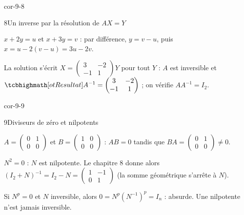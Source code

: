 \begin{blocLivre}{cor-9-8}
\begin{corrige}{8}{Un inverse par la résolution de $AX=Y$}
\begin{questions}
  \item $x+2y=u$ et $x+3y=v$ : par différence, $y=v-u$, puis
    $x=u-2(v-u)=3u-2v$.
  \item La solution s'écrit
    $X=\begin{pmatrix}3&-2\\-1&1\end{pmatrix}Y$ pour tout $Y$ : $A$ est
    inversible et
    $\res{A^{-1}=\begin{pmatrix}3&-2\\-1&1\end{pmatrix}}$ ;
    on vérifie $AA^{-1}=I_2$.
\end{questions}
\end{corrige}
\end{blocLivre}

\begin{blocLivre}{cor-9-9}
\begin{corrige}{9}{Diviseurs de zéro et nilpotents}
\begin{questions}
  \item $A=\begin{pmatrix}0&1\\0&0\end{pmatrix}$ et
    $B=\begin{pmatrix}1&0\\0&0\end{pmatrix}$ : $AB=0$ tandis que
    $BA=\begin{pmatrix}0&1\\0&0\end{pmatrix}\neq0$.
  \item $N^{2}=0$ : $N$ est nilpotente. Le chapitre 8 donne alors
    $(I_2+N)^{-1}=I_2-N=\begin{pmatrix}1&-1\\0&1\end{pmatrix}$
    (la somme géométrique s'arrête à $N$).
  \item Si $N^{p}=0$ et $N$ inversible, alors
    $0=N^{p}(N^{-1})^{p}=I_n$ : absurde. Une nilpotente n'est jamais
    inversible.
\end{questions}
\end{corrige}
\end{blocLivre}

